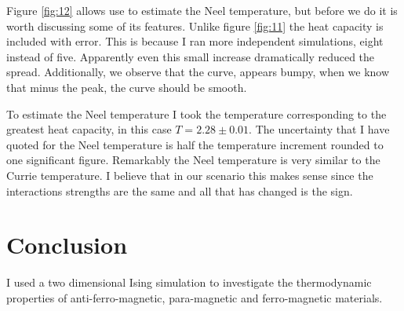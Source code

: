 \documentclass[a4paper, twocolumn]{article}
\begin{document}
Figure \ref{fig:12} allows use to estimate the Neel temperature, but %
before we do it is worth discussing some of its features. Unlike figure %
\ref{fig:11} the heat capacity is included with error. This is because %
I ran more independent simulations, eight instead of five. Apparently %
even this small increase dramatically reduced the spread. Additionally, %
we observe that the curve, appears bumpy, when we know that minus %
the peak, the curve should be smooth. 


To estimate the Neel temperature I took the temperature corresponding %
to the greatest heat capacity, in this case \(T = 2.28 \pm 0.01\). %
The uncertainty that I have quoted for the Neel temperature is half %
the temperature increment rounded to one significant figure. %
Remarkably the Neel temperature is very similar to the Currie temperature. %
I believe that in our scenario this makes sense since the interactions %
strengths are the same and all that has changed is the sign. 


\section*{Conclusion}
I used a two dimensional Ising simulation to investigate the thermodynamic %
properties of anti-ferro-magnetic, para-magnetic and ferro-magnetic %
materials. 
\end{document}
